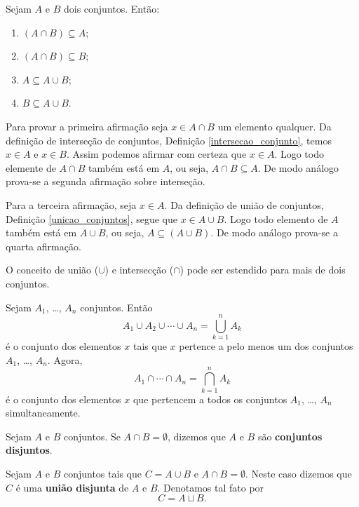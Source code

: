 \begin{proposicao} Sejam $A$ e $B$ dois conjuntos. Ent{\~a}o:
	\begin{enumerate}[label={\roman*})]
		\item $(A \cap B) \subseteq A$;
		\item $(A \cap B) \subseteq B$;
		\item $A \subseteq A \cup B$;
		\item $B \subseteq A \cup B$.
	\end{enumerate}
\end{proposicao}
\begin{prova}
	Para provar a primeira afirma\c{c}\~ao seja $x \in A \cap B$ um elemento qualquer. Da defini\c{c}\~ao de interse\c{c}\~ao de conjuntos, Defini\c{c}\~ao \ref{intersecao_conjunto}, temos $x \in A$ e $x \in B$. Assim podemos afirmar com certeza que $x \in A$. Logo todo elemente de $A \cap B$ tamb\'em est\'a em $A$, ou seja, $A \cap B \subseteq A$. De modo an\'alogo prova-se a segunda afirma\c{c}\~ao sobre interse\c{c}\~ao.

	Para a terceira afirma\c{c}\~ao, seja $x \in A$. Da defini\c{c}\~ao de uni\~ao de conjuntos, Defini\c{c}\~ao \ref{unicao_conjuntos}, segue que $x \in A \cup B$. Logo todo elemento de $A$ tamb\'em est\'a em $A \cup B$, ou seja, $A \subseteq (A \cup B)$. De modo an\'alogo prova-se a quarta afirma\c{c}\~ao.
\end{prova}

O conceito de uni{\~a}o ($ \cup $) e intersec{\c c}{\~a}o ($ \cap $) pode ser estendido para mais de dois conjuntos.

\begin{definicao}
Sejam $A_{1}$, \dots, $A_{n}$ conjuntos. Ent{\~a}o
\[
A_{1} \cup A_{2} \cup \cdots \cup A_{n}= \displaystyle\bigcup_{k=1}^n A_{k}
\]
{\'e} o conjunto dos elementos $x$ tais que $x$ pertence a pelo menos um dos conjuntos $A_{1}$, \dots, $A_{n}$. Agora,
\[
A_{1} \cap \cdots \cap A_{n} = \displaystyle\bigcap_{k=1}^{n}A_{k}
\]
{\'e} o conjunto dos elementos $x$ que pertencem a todos os conjuntos $A_{1}$, \dots, $A_{n}$ simultaneamente.
\end{definicao}

\begin{definicao}
	Sejam $A$ e $B$ conjuntos. Se $A \cap B = \emptyset$, dizemos que $A$ e $B$ s{\~a}o \textbf{conjuntos disjuntos}.	
\end{definicao}


Sejam $A$ e $B$ conjuntos tais que $C = A \cup B$ e $A \cap B = \emptyset$. Neste caso dizemos que $C$ {\'e} uma \textbf{uni{\~a}o disjunta} de $A$ e $B$. Denotamos tal fato por
\[
C = A \sqcup B.
\]


